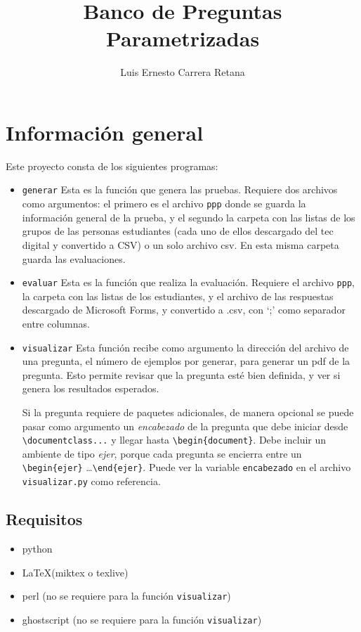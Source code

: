 \documentclass[12pt]{article}
\title{Banco de Preguntas Parametrizadas}
\author{Luis Ernesto Carrera Retana}
\theoremstyle{definition}
\begin{document}
\maketitle

\section{Información general}

Este proyecto consta de los siguientes programas:
\begin{itemize}
  \item \verb|generar| Esta es la función que genera las pruebas. Requiere dos archivos como argumentos: el primero es el archivo \verb|ppp| donde se guarda la información general de la prueba, y el segundo la carpeta con las listas de los grupos de las personas estudiantes (cada uno de ellos descargado del tec digital y convertido a CSV) o un solo archivo csv. En esta misma carpeta guarda las evaluaciones.

  \item \verb|evaluar| Esta es la función que realiza la evaluación. Requiere el archivo \verb|ppp|, la carpeta con las listas de los estudiantes, y el archivo de las respuestas descargado de Microsoft Forms, y convertido a .csv, con `;' como separador entre columnas.

  \item \verb|visualizar| Esta función recibe como argumento la dirección del archivo de una pregunta, el número de ejemplos por generar, para generar un pdf de la pregunta. Esto permite revisar que la pregunta esté bien definida, y ver si genera los resultados esperados.

    Si la pregunta requiere de paquetes adicionales, de manera opcional se puede pasar como argumento un \emph{encabezado} de la pregunta que debe iniciar desde \verb|\documentclass...| y llegar hasta \verb|\begin{document}|. Debe incluir un ambiente de tipo \emph{ejer}, porque cada pregunta se encierra entre un \verb|\begin{ejer}| \dots \verb|\end{ejer}|. Puede ver la variable \verb|encabezado| en el archivo \verb|visualizar.py| como referencia.
\end{itemize}

\subsection{Requisitos}
\begin{itemize}
  \item python
  \item \LaTeX (miktex o texlive)
  \item perl (no se requiere para la funci\'on \verb|visualizar|)
  \item ghostscript (no se requiere para la funci\'on \verb|visualizar|)
\end{itemize}
\end{document}
